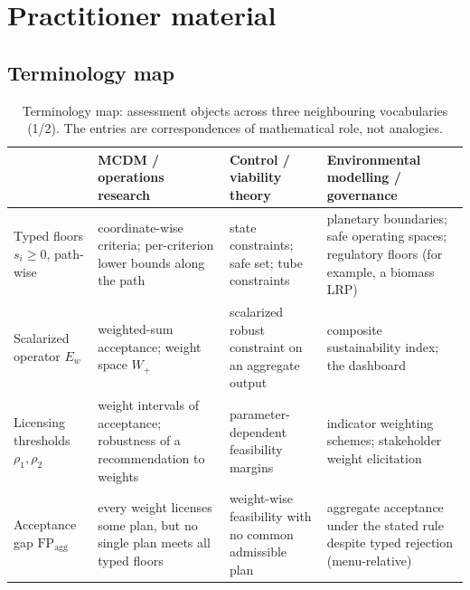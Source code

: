 \documentclass[preprint,11pt,authoryear]{elsarticle}
\theoremstyle{remark}
\newcommand{\Wp}{W_+}
\newcommand{\FP}{\mathrm{FP}_{\mathrm{agg}}}
\begin{document}
\section{Practitioner material}\label{si:practice}

\subsection{Terminology map}

\begin{table}[!htbp]
\centering\small
\caption{Terminology map: assessment objects across three neighbouring vocabularies (1/2). The entries are correspondences of mathematical role, not analogies.}
\label{tab:translation}
\begin{tabularx}{\textwidth}{@{}>{\raggedright\arraybackslash}p{}>{\raggedright\arraybackslash}X>{\raggedright\arraybackslash}X>{\raggedright\arraybackslash}X@{}}
\toprule
 & MCDM / operations research & Control / viability theory & Environmental modelling / governance \\
\midrule
Typed floors $s_i\ge0$, path-wise & coordinate-wise criteria; per-criterion lower bounds along the path & state constraints; safe set; tube constraints & planetary boundaries; safe operating spaces; regulatory floors (for example, a biomass LRP) \\
\addlinespace
Scalarized operator $E_w$ & weighted-sum acceptance; weight space $\Wp$ & scalarized robust constraint on an aggregate output & composite sustainability index; the dashboard \\
\addlinespace
Licensing thresholds $\rho_1,\rho_2$ & weight intervals of acceptance; robustness of a recommendation to weights & parameter-dependent feasibility margins & indicator weighting schemes; stakeholder weight elicitation \\
\addlinespace
Acceptance gap $\FP$ & every weight licenses some plan, but no single plan meets all typed floors & weight-wise feasibility with no common admissible plan & aggregate acceptance under the stated rule despite typed rejection (menu-relative) \\
\bottomrule
\end{tabularx}
\end{table}
\end{document}
